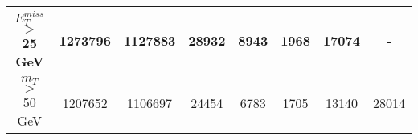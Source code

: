 \documentclass[10pt]{article}
\begin{document}
\begin{center}
\begin{table}[H]
\begin{adjustbox}{width=1\textwidth}
\begin{tabular}{cccccccc}
\multicolumn{1}{|c|}{$E_{T}^{miss}$ $>$ 25 GeV}  & \multicolumn{1}{c|}{1273796} & \multicolumn{1}{c|}{1127883} & \multicolumn{1}{c|}{28932} & \multicolumn{1}{c|}{8943} & \multicolumn{1}{c|}{1968} & \multicolumn{1}{c|}{17074} & \multicolumn{1}{c|}{-}  \\ \hline 
\multicolumn{1}{|c|}{$m_{T}$ $>$ 50 GeV}  & \multicolumn{1}{c|}{1207652} & \multicolumn{1}{c|}{1106697} & \multicolumn{1}{c|}{24454} & \multicolumn{1}{c|}{6783} & \multicolumn{1}{c|}{1705} & \multicolumn{1}{c|}{13140} & \multicolumn{1}{c|}{28014}  \\ \hline 
\end{tabular} 										
\end{adjustbox}										
\end{table} 											
\end{center}											
\end{document}
